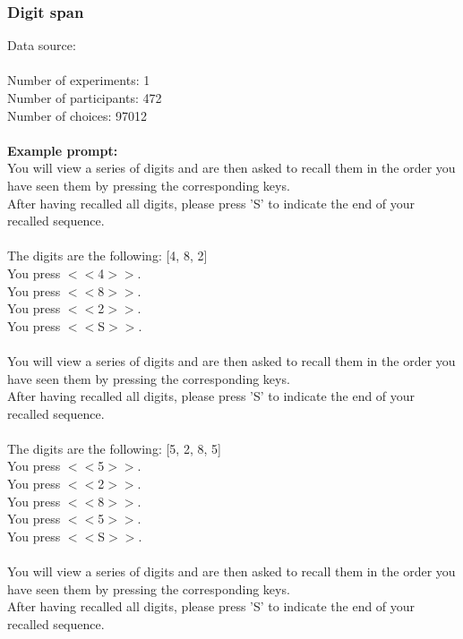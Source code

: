 \documentclass[pdflatex,sn-nature]{sn-jnl}%
\theoremstyle{thmstyleone}%
\theoremstyle{thmstyletwo}%
\theoremstyle{thmstylethree}%
\begin{document}
\subsubsection*{Digit span}
Data source: \cite{enkavi2019large} \\ $~$ \\
Number of experiments: 1 $~$\\ 
Number of participants: 472 $~$\\ 
Number of choices: 97012 $~$\\ 
 $~$\\ 
\textbf{Example prompt:}
 $~$\\ 
You will view a series of digits and are then asked to recall them in the order you have seen them by pressing the corresponding keys. $~$\\ 
After having recalled all digits, please press 'S' to indicate the end of your recalled sequence. $~$\\ 
 $~$\\ 
The digits are the following: [4, 8, 2] $~$\\ 
You press $<<$4$>>$. $~$\\ 
You press $<<$8$>>$. $~$\\ 
You press $<<$2$>>$. $~$\\ 
You press $<<$S$>>$.  $~$\\ 
 $~$\\ 
You will view a series of digits and are then asked to recall them in the order you have seen them by pressing the corresponding keys. $~$\\ 
After having recalled all digits, please press 'S' to indicate the end of your recalled sequence. $~$\\ 
 $~$\\ 
The digits are the following: [5, 2, 8, 5] $~$\\ 
You press $<<$5$>>$. $~$\\ 
You press $<<$2$>>$. $~$\\ 
You press $<<$8$>>$. $~$\\ 
You press $<<$5$>>$. $~$\\ 
You press $<<$S$>>$.  $~$\\ 
 $~$\\ 
You will view a series of digits and are then asked to recall them in the order you have seen them by pressing the corresponding keys. $~$\\ 
After having recalled all digits, please press 'S' to indicate the end of your recalled sequence. $~$\\ 
\end{document}
